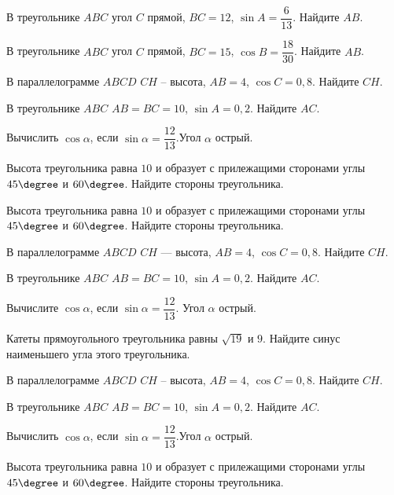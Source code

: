 \begin{homework}[number=2]
	\begin{listofex}
		\item В треугольнике \( ABC \) угол \( C \) прямой, \( BC=12 \), \( \sin A=\dfrac{6}{13} \). Найдите \( AB \).
		\item В треугольнике \( ABC \) угол \( C \) прямой, \( BC=15 \), \( \cos B=\dfrac{18}{30} \). Найдите \( AB \).
		\item  В параллелограмме \( ABCD \) \( CH \) – высота, \( AB = 4 \), \( \cos C = 0,8 \). Найдите \( CH \).
		\item  В треугольнике \( ABC \) \( AB = BC = 10 \), \( \sin A = 0,2 \). Найдите \( AC \).
		\item Вычислить \( \cos \alpha \), если \( \sin \alpha =\dfrac{12}{13}\).Угол \( \alpha \) острый.
		\item  Высота треугольника равна \( 10 \) и образует с прилежащими сторонами углы \( 45\degree \) и \( 60\degree \). Найдите стороны треугольника.
		\item  Высота треугольника равна \( 10 \) и образует с прилежащими сторонами углы \( 45\degree \) и \( 60\degree \). Найдите стороны треугольника.
		\item  В параллелограмме \( ABCD \) \( CH \) --- высота, \( AB = 4 \), \( \cos C = 0,8 \). Найдите \( CH \).
		\item  В треугольнике \( ABC \) \( AB = BC = 10 \), \( \sin A = 0,2 \). Найдите \( AC \).
		\item Вычислите \( \cos \alpha \), если \( \sin \alpha =\dfrac{12}{13} \). Угол \( \alpha \) острый.
		\item Катеты прямоугольного треугольника равны \( \sqrt{19} \) и \( 9 \). Найдите синус наименьшего угла этого треугольника.
		\item  В параллелограмме \( ABCD \) \( CH \) – высота, \( AB = 4 \), \( \cos C = 0,8 \). Найдите \( CH \).
		\item  В треугольнике \( ABC \) \( AB = BC = 10 \), \( \sin A = 0,2 \). Найдите \( AC \).
		\item Вычислить \( \cos \alpha \), если \( \sin \alpha =\dfrac{12}{13}\).Угол \( \alpha \) острый.
		\item  Высота треугольника равна \( 10 \) и образует с прилежащими сторонами углы \( 45\degree \) и \( 60\degree \). Найдите стороны треугольника.
	\end{listofex}
\end{homework}


